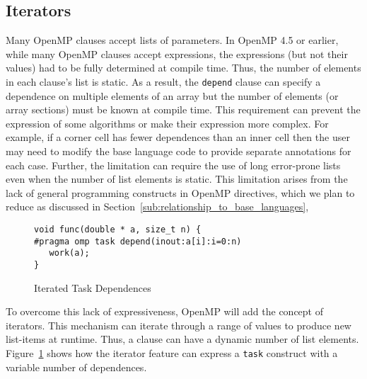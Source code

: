 \subsection{Iterators}
\label{sub:iterators}

Many OpenMP clauses accept lists of parameters. In OpenMP 4.5 or earlier, 
while many OpenMP clauses accept expressions, the expressions (but not 
their values) had to be fully determined at compile time. Thus, the number 
of elements in each clause's list is static. As a result,
the \texttt{depend} clause can specify a dependence on multiple elements
of an array but the number of elements (or array sections) must be known
at compile time. This requirement can prevent the expression of some
algorithms or make their expression more complex.  For example, if a 
corner cell has fewer dependences than an inner cell then the user may need 
to modify the base language code to provide separate annotations for each case.
Further, the limitation can require the use of long 
error-prone lists even when the number of list elements is static. This 
limitation arises from the lack of general programming constructs in 
OpenMP directives, which we plan to reduce as discussed in 
Section~\ref{sub:relationship_to_base_languages}, 

\begin{figure}
\begin{verbatim}
void func(double * a, size_t n) {
#pragma omp task depend(inout:a[i]:i=0:n)
   work(a);
}
\end{verbatim}
\caption{Iterated Task Dependences\label{fig:iterators}}
\end{figure}

To overcome this lack of expressiveness, OpenMP will add the concept of
iterators. This mechanism can iterate through a range of values to produce new
list-items at runtime. Thus, a clause can have a dynamic number of list
elements. Figure~\ref{fig:iterators} shows how the iterator feature can express
a \texttt{task} construct with a variable number of dependences.
